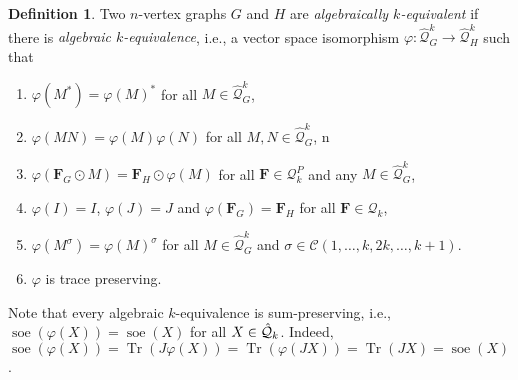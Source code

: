 \documentclass[11pt,a4paper]{article}
\theoremstyle{plain}
\theoremstyle{remark}
\theoremstyle{definition}
\newtheorem{definition}[thm]{Definition}
\DeclareMathOperator{\tr}{Tr}
\DeclareMathOperator{\soe}{soe}
\newcommand{\cyclicpermutations}{\mathscr{C}(1,\dots, k, 2k, \dots, k+1)}
\begin{document}
\begin{definition}\label{def:algebraic-k-quiv}
  Two $n$-vertex graphs $G$ and $H$ are \emph{algebraically $k$-equivalent} if there is \emph{algebraic $k$-equivalence}, i.e., a vector space isomorphism $\varphi\colon \widehat{\mathcal{Q}}_G^k \to \widehat{\mathcal{Q}}_H^k$ such that
  \begin{enumerate}
    \item $\varphi(M^*) = \varphi(M)^*$ for all $M\in\widehat{\mathcal{Q}}_G^k$,
    \item $\varphi(MN) = \varphi(M)\varphi(N)$ for all $M,N\in\widehat{\mathcal{Q}}_G^k$,
n    \item $\varphi(\boldsymbol{F}_G \odot M) = \boldsymbol{F}_H\odot\varphi(M)$ for all 
    $\boldsymbol{F}\in\mathcal{Q}_k^P$ and any $M\in\widehat{\mathcal{Q}}_G^k$,
    \item $\varphi(I) = I$, $\varphi(J) = J$  and $\varphi(\boldsymbol{F}_G) = \boldsymbol{F}_H$ for all $\boldsymbol{F}\in\mathcal{Q}_k$,
    \item $\varphi(M^\sigma) = \varphi(M)^\sigma$ for all $M\in\widehat{\mathcal{Q}}_G^k$ and $\sigma \in \cyclicpermutations$.
    \item $\varphi$ is trace preserving. 
  \end{enumerate}
\end{definition}


Note that every algebraic $k$-equivalence is sum-preserving, i.e., $\soe(\varphi(X)) = \soe(X)$ for all $X \in \hat{{\mathcal Q}}_k$. Indeed, $\soe(\varphi(X)) = \tr(J\varphi(X)) = \tr(\varphi(JX)) = \tr(JX) = \soe(X)$. 
\end{document}
